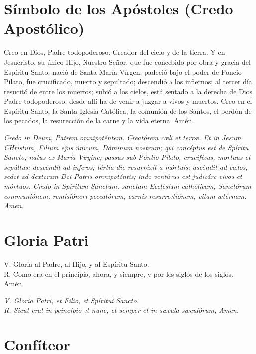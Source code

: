 \documentclass[a4paper,11pt, oneside]{report}
\begin{document}
  \section*{Símbolo de los Apóstoles (Credo Apostólico)}

    Creo en Dios, Padre todopoderoso. Creador del cielo y de la tierra. Y en Jesucristo, su único Hijo, Nuestro Señor, que fue concebido por
    obra y gracia del Espíritu Santo; nació de Santa María Vírgen; padeció bajo el poder de Poncio Pilato, fue crucificado, muerto y sepultado;
    descendió a los infiernos; al tercer día resucitó de entre los muertos; subió a los cielos, está sentado a la derecha de Dios Padre todopoderoso;
    desde allí ha de venir a juzgar a vivos y muertos. Creo en el Espíritu Santo, la Santa Iglesia Católica, la comunión de los Santos, el perdón
    de los pecados, la resurección de la carne y la vida eterna. Amén.

    \medskip

    \textit{Credo in Deum, Patrem omnipoténtem. Creatórem c{\oe}li et terr{\ae}. Et in Jesum CHristum, Filium ejus únicum, Dóminum nostrum; qui concéptus
    est de Spíritu Sancto; natus ex María Virgine; passus sub Póntio Pilato, crucifíxus, mortuus et sepúltus: descéndit ad inferos; tértia die resurréxit
    a mórtuis: ascéndit ad c{\oe}los, sedet ad dexteram Dei Patris omnipoténtis; inde ventúrus est judicáre vivos et mórtuos. Credo in Spíritum Sanctum,
    sanctam Ecclésiam cathólicam, Sanctórum communiónem, remisiónem peccatórum, carnis resurrectiónem, vitam {\ae}térnam. Amen.}

  \section*{Gloria Patri}

    V. Gloria al Padre, al Hijo, y al Espíritu Santo.\\
    \indent R. Como era en el principio, ahora, y siempre, y por los siglos de los siglos. Amén.

    \medskip

    \textit{V. Gloria Patri, et Filio, et Spíritui Sancto.}\\
    \indent \textit{R. Sicut erat in pcincípio et nunc, et semper et in s{\ae}cula s{\ae}culórum, Amen.}

  \section*{Confíteor}
\end{document}
